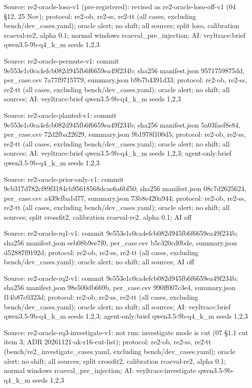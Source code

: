 \noindent Source: re2-oracle-loso-v1 (pre-registered): revised as re2-oracle-loso-off-v1 (04 \S{}12, 25 Nov); protocol: re2-ob, re2-ss, re2-tt (all cases, excluding bench/\allowbreak{}dev\_cases.yaml); oracle alert; no shift; all sources; split loso, calibration rcaeval-re2, alpha 0.1; normal windows rcaeval\_pre\_injection; AI: veyltrace:brief qwen3.5-9b-q4\_k\_m seeds 1,2,3\par
\noindent Source: re2-oracle-permute-v1: commit 9e553e1c0ca4efcb082d945fb6f6659ea49f234b; sha256 manifest.json 9571759875dd, per\_case.csv 7a77f9715779, summary.json b9b7b4391d33; protocol: re2-ob, re2-ss, re2-tt (all cases, excluding bench/\allowbreak{}dev\_cases.yaml); oracle alert; no shift; all sources; AI: veyltrace:brief qwen3.5-9b-q4\_k\_m seeds 1,2,3\par
\noindent Source: re2-oracle-planted-v1: commit 9e553e1c0ca4efcb082d945fb6f6659ea49f234b; sha256 manifest.json 5a03faef8e84, per\_case.csv 72d2fba22629, summary.json 9b1978f100d5; protocol: re2-ob, re2-ss, re2-tt (all cases, excluding bench/\allowbreak{}dev\_cases.yaml); oracle alert; no shift; all sources; AI: veyltrace:brief qwen3.5-9b-q4\_k\_m seeds 1,2,3; agent-only:brief qwen3.5-9b-q4\_k\_m seeds 1,2,3\par
\noindent Source: re2-oracle-prior-only-v1: commit 9cb317d782cf89f3184cb95618568dcae6a6bf50; sha256 manifest.json 08c7d2625624, per\_case.csv a439cfba1d77, summary.json 73b8e420a944; protocol: re2-ob, re2-ss, re2-tt (all cases, excluding bench/\allowbreak{}dev\_cases.yaml); oracle alert; no shift; all sources; split crossfit2, calibration rcaeval-re2, alpha 0.1; AI off\par
\noindent Source: re2-oracle-rq1-v1: commit 9e553e1c0ca4efcb082d945fb6f6659ea49f234b; sha256 manifest.json eeb08b9ee7f0, per\_case.csv b5c320cd0bde, summary.json d52887f9192d; protocol: re2-ob, re2-ss, re2-tt (all cases, excluding bench/\allowbreak{}dev\_cases.yaml); oracle alert; no shift; all sources; AI off\par
\noindent Source: re2-oracle-rq2-v1: commit 9e553e1c0ca4efcb082d945fb6f6659ea49f234b; sha256 manifest.json 98e500db669b, per\_case.csv 990ff007c3e4, summary.json f14b87c0323d; protocol: re2-ob, re2-ss, re2-tt (all cases, excluding bench/\allowbreak{}dev\_cases.yaml); oracle alert; no shift; all sources; AI: veyltrace:brief qwen3.5-9b-q4\_k\_m seeds 1,2,3; agent-only:brief qwen3.5-9b-q4\_k\_m seeds 1,2,3\par
\noindent Source: re2-oracle-rq3-investigate-v1: not run: investigate mode is cut (07 \S{}1.1 cut item 3; ADR 20261121-ak-r16-cut-list); protocol: re2-ob, re2-ss, re2-tt (bench/\allowbreak{}re2\_investigate\_cases.yaml, excluding bench/\allowbreak{}dev\_cases.yaml); oracle alert; no shift; all sources; split crossfit2, calibration rcaeval-re2, alpha 0.1; normal windows rcaeval\_pre\_injection; AI: veyltrace:investigate qwen3.5-9b-q4\_k\_m seeds 1,2,3\par
